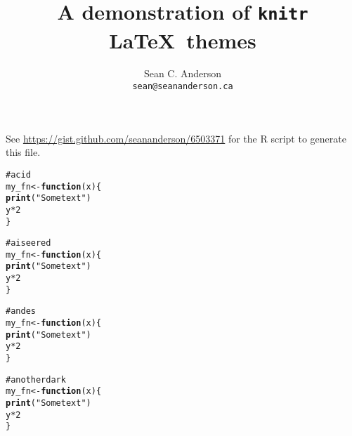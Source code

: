 \documentclass[12pt]{article}\usepackage{graphicx, color}
\makeatletter
\newcommand{\hlfunctioncall}[1]{\textcolor[rgb]{0.188235294117647,0.650980392156863,0.188235294117647}{\textbf{#1}}}%
\newcommand{\hlstring}[1]{\textcolor[rgb]{0.850980392156863,1,0.466666666666667}{#1}}%
\newcommand{\hlcomment}[1]{\textcolor[rgb]{0.533333333333333,0.533333333333333,0.533333333333333}{#1}}%
\newenvironment{kframe}{%
 \def\at@end@of@kframe{}%
 \ifinner\ifhmode%
  \def\at@end@of@kframe{\end{minipage}}%
  \begin{minipage}{\columnwidth}%
 \fi\fi%
 \def\FrameCommand##1{\hskip\@totalleftmargin \hskip-\fboxsep
 \colorbox{shadecolor}{##1}\hskip-\fboxsep
     \hskip-\linewidth \hskip-\@totalleftmargin \hskip\columnwidth}%
 \MakeFramed {\advance\hsize-\width
   \@totalleftmargin\z@ \linewidth\hsize
   \@setminipage}}%
 {\par\unskip\endMakeFramed%
 \at@end@of@kframe}
\newenvironment{knitrout}{}{} %
\makeatother
\begin{document}
\title{A demonstration of \texttt{knitr} \LaTeX\ themes}
\author{Sean C. Anderson\\ \texttt{sean@seananderson.ca}}
\maketitle
\noindent
See \url{https://gist.github.com/seananderson/6503371} for the 
R script to generate this file.





\begin{knitrout}
\color{fgcolor}\begin{kframe}
\begin{alltt}
\hlcomment{# acid}
my_fn <- \hlfunctioncall{function}(x) \{
    \hlfunctioncall{print}(\hlstring{"Some text"})
    y * 2
\}
\end{alltt}
\end{kframe}
\end{knitrout}





\begin{knitrout}
\color{fgcolor}\begin{kframe}
\begin{alltt}
\hlcomment{# aiseered}
my_fn <- \hlfunctioncall{function}(x) \{
    \hlfunctioncall{print}(\hlstring{"Some text"})
    y * 2
\}
\end{alltt}
\end{kframe}
\end{knitrout}





\begin{knitrout}
\color{fgcolor}\begin{kframe}
\begin{alltt}
\hlcomment{# andes}
my_fn <- \hlfunctioncall{function}(x) \{
    \hlfunctioncall{print}(\hlstring{"Some text"})
    y * 2
\}
\end{alltt}
\end{kframe}
\end{knitrout}





\begin{knitrout}
\color{fgcolor}\begin{kframe}
\begin{alltt}
\hlcomment{# anotherdark}
my_fn <- \hlfunctioncall{function}(x) \{
    \hlfunctioncall{print}(\hlstring{"Some text"})
    y * 2
\}
\end{alltt}
\end{kframe}
\end{knitrout}
\end{document}
